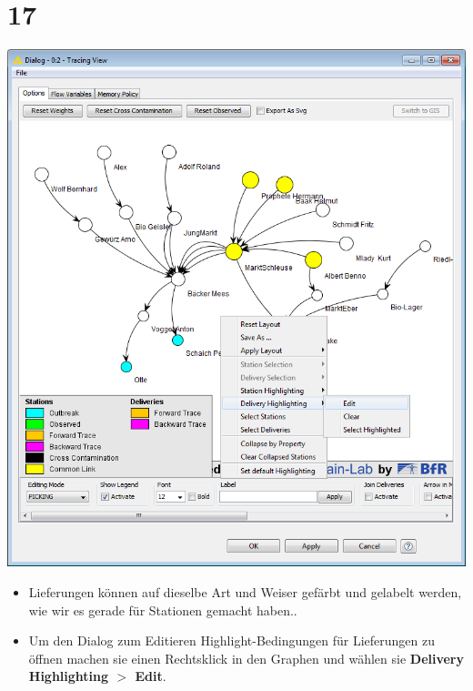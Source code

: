 \documentclass{beamer}
\begin{document}
\section{17}
\begin{frame}
	\begin{center}
  		\includegraphics[height=0.6\textheight]{17.png}
	\end{center}
	\begin{itemize}
		\item Lieferungen können auf dieselbe Art und Weiser gefärbt und gelabelt werden, wie wir es gerade für Stationen gemacht haben..
		\item Um den Dialog zum Editieren Highlight-Bedingungen für Lieferungen zu öffnen machen sie einen Rechtsklick in den Graphen und wählen sie \textbf{Delivery Highlighting $>$ Edit}.
	\end{itemize}
\end{frame}
\end{document}
